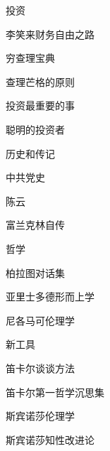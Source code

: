 投资
\begin{enumbox} 
\item 李笑来财务自由之路
\item 穷查理宝典
\item 查理芒格的原则
\item 投资最重要的事
\item 聪明的投资者
\end{enumbox} 

历史和传记
\begin{enumbox} 
\item 中共党史
\item 陈云
\item 富兰克林自传
\end{enumbox} 

哲学
\begin{enumbox} 
\item 柏拉图对话集
\item 亚里士多德形而上学
\item 尼各马可伦理学
\item 新工具
\item 笛卡尔谈谈方法
\item 笛卡尔第一哲学沉思集
\item 斯宾诺莎伦理学
\item 斯宾诺莎知性改进论
\end{enumbox} 
